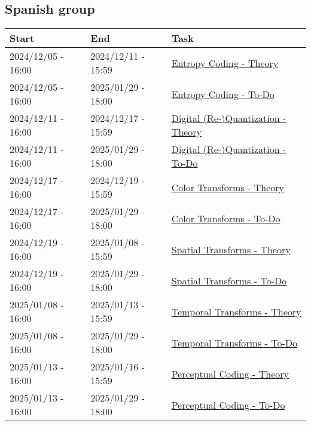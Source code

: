 \subsection{Spanish group}
\begin{tabular}{|l|l|l|}
  \hline
  Start & End & Task \\
  \hline
  2024/12/05 - 16:00 & 2024/12/11 - 15:59 & \href{https://sistemas-multimedia.github.io/contents/entropy_coding/}{Entropy Coding - Theory} \\ %
  2024/12/05 - 16:00 & 2025/01/29 - 18:00 & \href{https://sistemas-multimedia.github.io/contents/entropy_coding/#x1-110007}{Entropy Coding - To-Do} \\
  2024/12/11 - 16:00 & 2024/12/17 - 15:59 & \href{https://sistemas-multimedia.github.io/contents/quantization/}{Digital (Re-)Quantization - Theory} \\ %
  2024/12/11 - 16:00 & 2025/01/29 - 18:00 & \href{https://sistemas-multimedia.github.io/contents/quantization/#x1-150008}{Digital (Re-)Quantization - To-Do} \\
  2024/12/17 - 16:00 & 2024/12/19 - 15:59 & \href{https://sistemas-multimedia.github.io/contents/color_transforms/}{Color Transforms - Theory} \\ %
  2024/12/17 - 16:00 & 2025/01/29 - 18:00 & \href{https://sistemas-multimedia.github.io/contents/color_transforms/#x1-100006}{Color Transforms - To-Do} \\
  2024/12/19 - 16:00 & 2025/01/08 - 15:59 & \href{https://sistemas-multimedia.github.io/contents/spatial_transforms/}{Spatial Transforms - Theory} \\ %
  2024/12/19 - 16:00 & 2025/01/29 - 18:00 & \href{https://sistemas-multimedia.github.io/contents/spatial_transforms/#x1-80006}{Spatial Transforms - To-Do} \\
  2025/01/08 - 16:00 & 2025/01/13 - 15:59 & \href{https://sistemas-multimedia.github.io/contents/temporal_transforms/}{Temporal Transforms - Theory} \\ %
  2025/01/08 - 16:00 & 2025/01/29 - 18:00 & \href{https://sistemas-multimedia.github.io/contents/temporal_transforms/#x1-90008}{Temporal Transforms - To-Do} \\
  2025/01/13 - 16:00 & 2025/01/16 - 15:59 & \href{https://sistemas-multimedia.github.io/contents/perceptual_coding/}{Perceptual Coding - Theory} \\ %
  2025/01/13 - 16:00 & 2025/01/29 - 18:00 & \href{https://sistemas-multimedia.github.io/contents/perceptual_coding/#x1-100009}{Perceptual Coding - To-Do} \\

\end{tabular}
